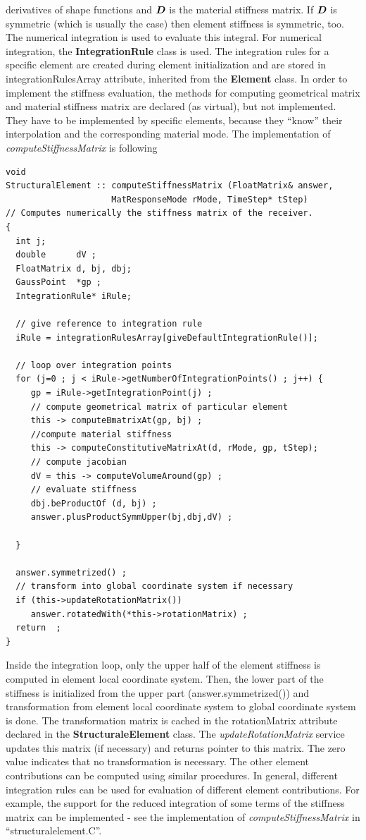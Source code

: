 \documentclass[a4paper]{article}
\newcommand{\class}[1]{{\bf #1}}
\newcommand{\service}[1]{{\em #1}}
\newcommand{\attribute}[1]{#1}
\newcommand{\file}[1]{``#1''}
\newcommand{\mbf}[1]{\mbox{\boldmath$#1$}}
\begin{document}
derivatives of shape functions and $\mbf{D}$ is the material stiffness
matrix. If $\mbf{D}$ is symmetric (which is usually the case) then
element stiffness is symmetric, too. The numerical integration is used to evaluate this integral.
For numerical integration, the  \class{IntegrationRule} class is used.
The integration rules for a specific element are created during element
initialization and are stored in \attribute{integrationRulesArray} attribute,
inherited from the \class{Element} class. In order to implement the stiffness
evaluation, the methods for computing geometrical matrix and material stiffness
matrix are declared (as virtual), but not implemented. They have to
be implemented by specific elements, because they ``know'' their interpolation
and the corresponding material mode. 
The implementation of
\service{computeStiffnessMatrix} is following
\begin{verbatim}
void
StructuralElement :: computeStiffnessMatrix (FloatMatrix& answer, 
                     MatResponseMode rMode, TimeStep* tStep)
// Computes numerically the stiffness matrix of the receiver.
{
  int j;
  double      dV ;
  FloatMatrix d, bj, dbj;
  GaussPoint  *gp ;
  IntegrationRule* iRule;

  // give reference to integration rule
  iRule = integrationRulesArray[giveDefaultIntegrationRule()];
     
  // loop over integration points
  for (j=0 ; j < iRule->getNumberOfIntegrationPoints() ; j++) {
     gp = iRule->getIntegrationPoint(j) ;
     // compute geometrical matrix of particular element 
     this -> computeBmatrixAt(gp, bj) ;  
     //compute material stiffness
     this -> computeConstitutiveMatrixAt(d, rMode, gp, tStep); 
     // compute jacobian
     dV = this -> computeVolumeAround(gp) ; 
     // evaluate stiffness
     dbj.beProductOf (d, bj) ;
     answer.plusProductSymmUpper(bj,dbj,dV) ; 

  }
 
  answer.symmetrized() ;
  // transform into global coordinate system if necessary
  if (this->updateRotationMatrix()) 
     answer.rotatedWith(*this->rotationMatrix) ;
  return  ;
}
\end{verbatim}
Inside the integration loop, only the upper half of the element stiffness is
computed in element local coordinate system. Then, the lower part of 
the stiffness is initialized from the upper part (answer.symmetrized()) and
transformation from element local coordinate system to global
coordinate system is done. The transformation matrix is cached in
the \attribute{rotationMatrix} attribute declared in the \class{StructuraleElement} class. 
The \service{updateRotationMatrix} service
updates this matrix (if necessary) and returns pointer to this matrix.
The zero value indicates that no transformation is necessary. 
The other element contributions can be computed using similar
procedures. In general, different integration rules can be used for
evaluation of different element contributions. For example, the
support for the reduced
integration of some terms of the stiffness matrix can be implemented - see
the implementation of \service{computeStiffnessMatrix} in \file{structuralelement.C}.
\end{document}
